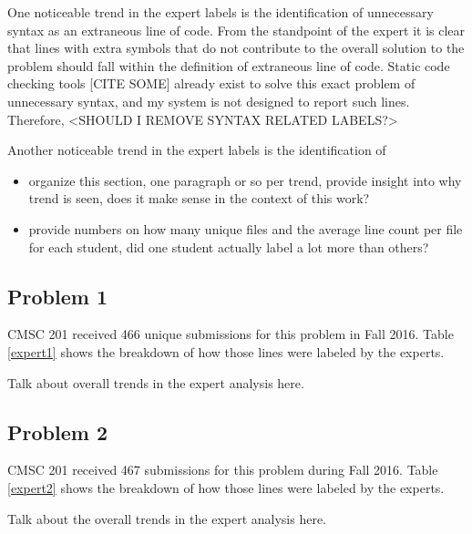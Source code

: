 One noticeable trend in the expert labels is the identification of unnecessary syntax as an extraneous line of code. From the standpoint of the expert it is clear that lines with extra symbols that do not contribute to the overall solution to the problem should fall within the definition of extraneous line of code. Static code checking tools [CITE SOME] already exist to solve this exact problem of unnecessary syntax, and my system is not designed to report such lines. Therefore, <SHOULD I REMOVE SYNTAX RELATED LABELS?>

Another noticeable trend in the expert labels is the identification of
    

\begin{itemize}
    \item organize this section, one paragraph or so per trend, provide insight into why trend is seen, does it make sense in the context of this work?
    \item provide numbers on how many unique files and the average line count per file for each student, did one student actually label a lot more than others?
\end{itemize}



\subsection{Problem 1}
CMSC 201 received 466 unique submissions for this problem in Fall 2016. Table \ref{expert1} shows the breakdown of how those lines were labeled by the experts. 

Talk about overall trends in the expert analysis here.

\subsection{Problem 2}
CMSC 201 received 467 submissions for this problem during Fall 2016. Table \ref{expert2} shows the breakdown of how those lines were labeled by the experts.

Talk about the overall trends in the expert analysis here. 


